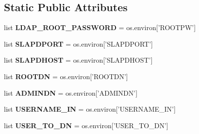 \subsection*{Static Public Attributes}
\begin{DoxyCompactItemize}
\item 
\hypertarget{classconfig_1_1Config_a274d1112585561b071ba84299e30142a}{list {\bfseries L\-D\-A\-P\-\_\-\-R\-O\-O\-T\-\_\-\-P\-A\-S\-S\-W\-O\-R\-D} = os.\-environ\mbox{[}'R\-O\-O\-T\-P\-W'\mbox{]}}\label{classconfig_1_1Config_a274d1112585561b071ba84299e30142a}

\item 
\hypertarget{classconfig_1_1Config_a484d232d78b4f414d8066799a237d451}{list {\bfseries S\-L\-A\-P\-D\-P\-O\-R\-T} = os.\-environ\mbox{[}'S\-L\-A\-P\-D\-P\-O\-R\-T'\mbox{]}}\label{classconfig_1_1Config_a484d232d78b4f414d8066799a237d451}

\item 
\hypertarget{classconfig_1_1Config_ab2fdceff538b5908c1d4f88eadab3c5b}{list {\bfseries S\-L\-A\-P\-D\-H\-O\-S\-T} = os.\-environ\mbox{[}'S\-L\-A\-P\-D\-H\-O\-S\-T'\mbox{]}}\label{classconfig_1_1Config_ab2fdceff538b5908c1d4f88eadab3c5b}

\item 
\hypertarget{classconfig_1_1Config_aedc19cf03da3edc6b41841a6c00491a8}{list {\bfseries R\-O\-O\-T\-D\-N} = os.\-environ\mbox{[}'R\-O\-O\-T\-D\-N'\mbox{]}}\label{classconfig_1_1Config_aedc19cf03da3edc6b41841a6c00491a8}

\item 
\hypertarget{classconfig_1_1Config_a8c5c6504477e14ea7c9086a165c17150}{list {\bfseries A\-D\-M\-I\-N\-D\-N} = os.\-environ\mbox{[}'A\-D\-M\-I\-N\-D\-N'\mbox{]}}\label{classconfig_1_1Config_a8c5c6504477e14ea7c9086a165c17150}

\item 
\hypertarget{classconfig_1_1Config_ac85c1a894f69b1fd6a5e8997e0066ff9}{list {\bfseries U\-S\-E\-R\-N\-A\-M\-E\-\_\-\-I\-N} = os.\-environ\mbox{[}'U\-S\-E\-R\-N\-A\-M\-E\-\_\-\-I\-N'\mbox{]}}\label{classconfig_1_1Config_ac85c1a894f69b1fd6a5e8997e0066ff9}

\item 
\hypertarget{classconfig_1_1Config_a9b2b96d80a364b00eb74f09cbc300dc4}{list {\bfseries U\-S\-E\-R\-\_\-\-T\-O\-\_\-\-D\-N} = os.\-environ\mbox{[}'U\-S\-E\-R\-\_\-\-T\-O\-\_\-\-D\-N'\mbox{]}}\label{classconfig_1_1Config_a9b2b96d80a364b00eb74f09cbc300dc4}

\end{DoxyCompactItemize}


